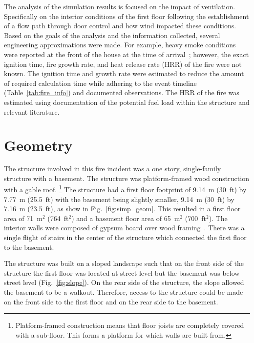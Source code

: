 \documentclass[12pt,oneside]{book}
\begin{document}
The analysis of the simulation results is focused on the impact of ventilation. Specifically on the interior conditions of the first floor following the establishment of a flow path through door control and how wind impacted these conditions. Based on the goals of the analysis and the information collected, several engineering approximations were made. For example, heavy smoke conditions were reported at the front of the house at the time of arrival~\cite{PGCounty2013}; however, the exact ignition time, fire growth rate, and heat release rate (HRR) of the fire were not known. The ignition time and growth rate were estimated to reduce the amount of required calculation time while adhering to the event timeline (Table~\ref{tab:fire_info}) and documented observations. The HRR of the fire was estimated using documentation of the potential fuel load within the structure and relevant literature.

\section{Geometry}
\label{geom}
The structure involved in this fire incident was a one story, single-family structure with a basement. The structure was platform-framed wood construction with a gable roof. \footnote{Platform-framed construction means that floor joists are completely covered with a sub-floor. This forms a platform for which walls are built from.} The structure had a first floor footprint of 9.14~m (30~ft) by 7.77~m (25.5~ft) with the basement being slightly smaller, 9.14~m (30~ft) by 7.16~m (23.5~ft), as show in Fig.~\ref{fig:simp_geom}. This resulted in a first floor area of 71~m$^2$ (764~ft$^2$) and a basement floor area of 65~m$^2$ (700~ft$^2$). The interior walls were composed of gypsum board over wood framing~\cite{PGCounty2013}. There was a single flight of stairs in the center of the structure which connected the first floor to the basement. 

The structure was built on a sloped landscape such that on the front side of the structure the first floor was located at street level but the basement was below street level (Fig.~\ref{fig:slope}). On the rear side of the structure, the slope allowed the basement to be a walkout. Therefore, access to the structure could be made on the front side to the first floor and on the rear side to the basement.
\end{document}
